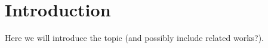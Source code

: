 
\section{Introduction}
\label{sec:intro}

Here we will introduce the topic (and possibly include related works?).


